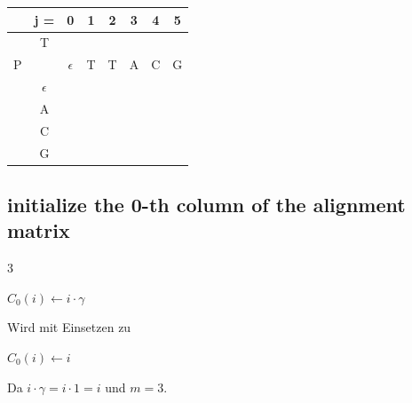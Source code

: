 \begin{center}
    \begin{tabular}{|c c|c|c|c|c|c|c|} \hline
    &   j =  &  0           &   1   &   2   &   3   &   4   &   5   \\ \hline
    &   T    &              &       &       &       &       &       \\
    P   &        &  $\epsilon$  &   T   &   T   &   A   &   C   &   G   \\ \hline
    & $\epsilon$ &              &       &       &       &       &       \\ \hline
    &    A   &              &       &       &       &       &       \\ \hline
    &    C   &              &       &       &       &       &       \\ \hline
    &    G   &              &       &       &       &       &       \\ \hline
    \end{tabular}
\end{center}

\subsection*{initialize the 0-th column of the alignment matrix}
\begin{multicols}{3}
    \begin{algorithmic}
            \State $C_0 (i) \gets i \cdot \gamma$
        \EndFor
    \end{algorithmic}
    \columnbreak
    Wird mit Einsetzen zu
    \columnbreak
    \begin{algorithmic}
            \State $C_0 (i) \gets i $
        \EndFor
    \end{algorithmic}
\end{multicols}
\noindent Da $i \cdot \gamma = i \cdot 1 = i$ und $m = 3$.


